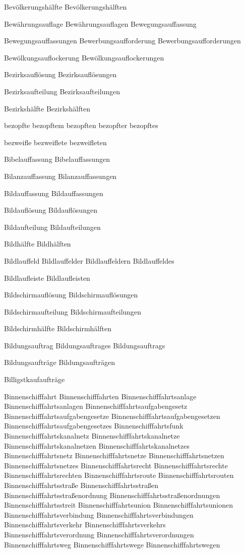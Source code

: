 Bevölkerungshälfte
Bevölkerungshälften

Bewährungsauflage
Bewährungsauflagen
Bewegungsauffassung

Bewegungsauffassungen
Bewerbungsaufforderung
Bewerbungsaufforderungen

Bewölkungsauflockerung
Bewölkungsauflockerungen

Bezirksauflösung
Bezirksauflösungen

Bezirksaufteilung
Bezirksaufteilungen

Bezirkshälfte
Bezirkshälften

bezopfte
bezopftem
bezopften
bezopfter
bezopftes

bezweifle
bezweiflete
bezweifleten

Bibelauffassung
Bibelauffassungen

Bilanzauffassung
Bilanzauffassungen

Bildauffassung
Bildauffassungen

Bildauflösung
Bildauflösungen

Bildaufteilung
Bildaufteilungen

Bildhälfte
Bildhälften

Bildlauffeld
Bildlauffelder
Bildlauffeldern
Bildlauffeldes

Bildlaufleiste
Bildlaufleisten

Bildschirmauflösung
Bildschirmauflösungen

Bildschirmaufteilung
Bildschirmaufteilungen

Bildschirmhälfte
Bildschirmhälften

Bildungsauftrag
Bildungsauftrages
Bildungsauftrags

Bildungsaufträge
Bildungsaufträgen

Billigstkaufaufträge

Binnenschifffahrt
Binnenschifffahrten
Binnenschifffahrtsanlage
Binnenschifffahrtsanlagen
Binnenschifffahrtsaufgabengesetz
Binnenschifffahrtsaufgabengesetze
Binnenschifffahrtsaufgabengesetzen
Binnenschifffahrtsaufgabengesetzes
Binnenschifffahrtsfunk
Binnenschifffahrtskanalnetz
Binnenschifffahrtskanalnetze
Binnenschifffahrtskanalnetzen
Binnenschifffahrtskanalnetzes
Binnenschifffahrtsnetz
Binnenschifffahrtsnetze
Binnenschifffahrtsnetzen
Binnenschifffahrtsnetzes
Binnenschifffahrtsrecht
Binnenschifffahrtsrechte
Binnenschifffahrtsrechten
Binnenschifffahrtsroute
Binnenschifffahrtsrouten
Binnenschifffahrtsstraße
Binnenschifffahrtsstraßen
Binnenschifffahrtsstraßenordnung
Binnenschifffahrtsstraßenordnungen
Binnenschifffahrtsstreit
Binnenschifffahrtsunion
Binnenschifffahrtsunionen
Binnenschifffahrtsverbindung
Binnenschifffahrtsverbindungen
Binnenschifffahrtsverkehr
Binnenschifffahrtsverkehrs
Binnenschifffahrtsverordnung
Binnenschifffahrtsverordnungen
Binnenschifffahrtsweg
Binnenschifffahrtswege
Binnenschifffahrtswegen


